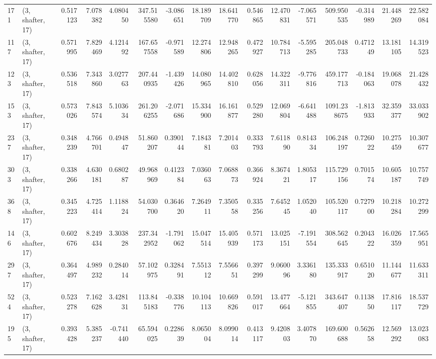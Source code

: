 \begin{tabular}{llrrrrrrrrrrrrrr}
171 &  (3, shafter, 17) &   0.517123 &   7.078382 &   4.080450 &   347.515580 &  -3.086651 &  18.189709 &  18.641770 &  0.546865 &  12.470831 &  -7.065571 &    509.950535 &  -0.314989 &   21.448269 &   22.582084 \\
117 &  (3, shafter, 17) &   0.571995 &   7.829469 &   4.121492 &   167.657558 &  -0.971589 &  12.274806 &  12.948265 &  0.472927 &  10.784713 &  -5.595285 &    205.048733 &   0.471249 &   13.181105 &   14.319523 \\
123 &  (3, shafter, 17) &   0.536518 &   7.343860 &   3.027763 &   207.440935 &  -1.439426 &  14.080965 &  14.402810 &  0.628056 &  14.322311 &  -9.776816 &    459.177713 &  -0.184063 &   19.068078 &   21.428432 \\
153 &  (3, shafter, 17) &   0.573026 &   7.843574 &   5.103634 &   261.206255 &  -2.071686 &  15.334900 &  16.161877 &  0.529280 &  12.069804 &  -6.641488 &   1091.238675 &  -1.813933 &   32.359377 &   33.033902 \\
237 &  (3, shafter, 17) &   0.348239 &   4.766701 &   0.494847 &    51.860207 &   0.390144 &   7.184381 &   7.201403 &  0.333793 &   7.611890 &   0.814334 &    106.248197 &   0.726022 &   10.275459 &   10.307677 \\
303 &  (3, shafter, 17) &   0.338266 &   4.630181 &   0.680287 &    49.968969 &   0.412384 &   7.036063 &   7.068873 &  0.366924 &   8.367421 &   1.805317 &    115.729156 &   0.701574 &   10.605187 &   10.757749 \\
368 &  (3, shafter, 17) &   0.345223 &   4.725414 &   1.118824 &    54.030700 &   0.364620 &   7.264911 &   7.350558 &  0.335256 &   7.645245 &   1.052040 &    105.520117 &   0.727900 &   10.218284 &   10.272299 \\
146 &  (3, shafter, 17) &   0.602676 &   8.249434 &   3.303828 &   237.342952 &  -1.791062 &  15.047514 &  15.405939 &  0.571173 &  13.025151 &  -7.191554 &    308.562645 &   0.204322 &   16.026359 &   17.565951 \\
297 &  (3, shafter, 17) &   0.364497 &   4.989232 &   0.284014 &    57.102975 &   0.328491 &   7.551312 &   7.556651 &  0.397299 &   9.060096 &   3.336180 &    135.333917 &   0.651020 &   11.144677 &   11.633311 \\
524 &  (3, shafter, 17) &   0.523278 &   7.162628 &   3.428131 &   113.845183 &  -0.338776 &  10.104113 &  10.669826 &  0.591017 &  13.477664 &  -5.121855 &    343.647407 &   0.113850 &   17.816117 &   18.537729 \\
195 &  (3, shafter, 17) &   0.393428 &   5.385237 &  -0.741440 &    65.594025 &   0.228639 &   8.065004 &   8.099014 &  0.413117 &   9.420803 &   3.407870 &    169.600688 &   0.562658 &   12.569292 &   13.023083 \\

\end{tabular}
